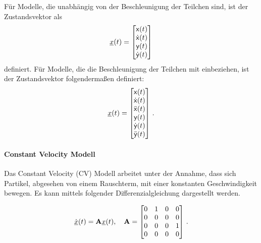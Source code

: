 Für Modelle, die unabhängig von der Beschleunigung der Teilchen sind, ist der Zustandsvektor als 
% 
\begin{equation} \label{eq:definitionCV}
    {\underline{x}}(t) = 
    \begin{bmatrix}
        \mathsf{x}(t) \\
        \dot{\mathsf{x}}(t) \\
        \mathsf{y}(t) \\
        \dot{\mathsf{y}}(t)
       \end{bmatrix} 
\end{equation}
% 
definiert.
Für Modelle, die die Beschleunigung der Teilchen mit einbeziehen, ist der Zustandsvektor folgendermaßen definiert:
% 
\begin{equation} \label{eq:definitionCA}
    {\underline{x}}(t) = 
    \begin{bmatrix}
        \mathsf{x}(t) \\
        \dot{\mathsf{x}}(t) \\
        \ddot{\mathsf{x}}(t) \\
        \mathsf{y}(t) \\
        \dot{\mathsf{y}}(t) \\
        \ddot{\mathsf{y}}(t)
       \end{bmatrix} \, .
\end{equation}

\paragraph{Constant Velocity Modell}

Das Constant Velocity (CV) Modell arbeitet unter der Annahme, dass sich Partikel, 
abgesehen von einem Rauschterm, mit einer konstanten Geschwindigkeit bewegen.
Es kann mittels folgender Differenzialgleichung dargestellt werden.

\begin{equation*} \label{eq:CVDiff}
    \dot{{\underline{x}}}(t) = {{\mathbf{A}}}{\underline{x}}(t), \quad {\ensuremath{{\mathbf{A}}}} = 
    \begin{bmatrix}
        0 & 1 & 0 & 0 \\
        0 & 0 & 0 & 0 \\
        0 & 0 & 0 & 1\\
        0 & 0 & 0 & 0
    \end{bmatrix} \, .
\end{equation*}

